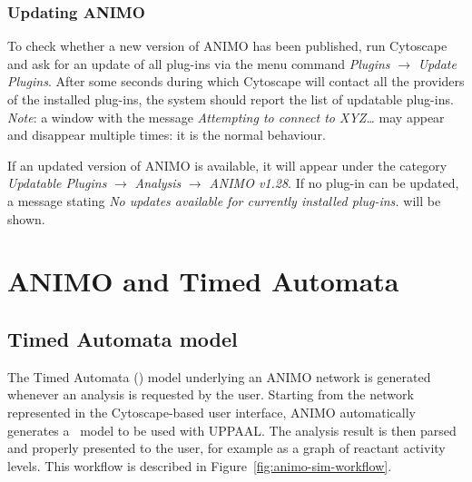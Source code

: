 \subsubsection{Updating ANIMO}
To check whether a new version of ANIMO has been published, run Cytoscape and ask for an update of all
plug-ins via the menu command \emph{Plugins} $\rightarrow$ \emph{Update Plugins}. After some seconds
during which Cytoscape will contact all the providers of the installed plug-ins,
the system should report the list of updatable plug-ins.\\
\emph{Note}: a window with the message \emph{Attempting to connect to XYZ\dots} may appear and disappear multiple times:
it is the normal behaviour.

If an updated version of ANIMO is available, it will appear
under the category \emph{Updatable Plugins} $\rightarrow$
\emph{Analysis} $\rightarrow$ \emph{ANIMO v1.28}. If no plug-in can be updated, a message stating \emph{No
updates available for currently installed plug-ins.} will be shown.









\clearpage
\section{ANIMO and Timed Automata}\label{suppl-sec:animo-ta}

\subsection{Timed Automata model}
The Timed Automata (\tas) model underlying an ANIMO network is generated whenever an analysis is requested by the user.
Starting from the network represented in the Cytoscape-based user interface, ANIMO automatically generates a \tas\ model
to be used with UPPAAL. The analysis result is then parsed and properly presented to the user, for example
as a graph of reactant activity levels. This workflow is described in Figure~\ref{fig:animo-sim-workflow}.

